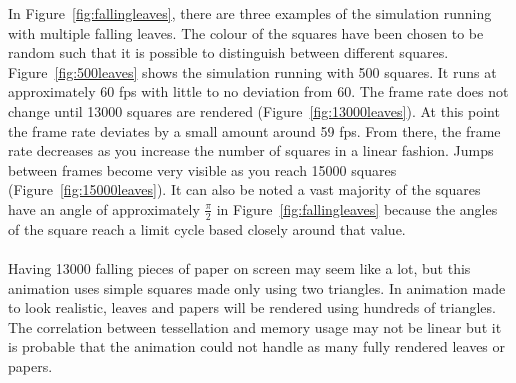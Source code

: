 \noindent In Figure~\ref{fig:fallingleaves}, there are three examples of the simulation running with multiple falling leaves. The colour of the squares have been chosen to be random such that it is possible to distinguish between different squares. Figure~\ref{fig:500leaves} shows the simulation running with 500 squares. It runs at approximately 60 fps with little to no deviation from 60. The frame rate does not change until 13000 squares are rendered (Figure~\ref{fig:13000leaves}). At this point the frame rate deviates by a small amount around 59 fps. From there, the frame rate decreases as you increase the number of squares in a linear fashion. Jumps between frames become very visible as you reach 15000 squares (Figure~\ref{fig:15000leaves}). It can also be noted a vast majority of the squares have an angle of approximately $\frac{\pi}{2}$ in Figure~\ref{fig:fallingleaves} because the angles of the square reach a limit cycle based closely around that value.
\\
\\
Having 13000 falling pieces of paper on screen may seem like a lot, but this animation uses simple squares made only using two triangles. In animation made to look realistic, leaves and papers will be rendered using hundreds of triangles. The correlation between tessellation and memory usage may not be linear but it is probable that the animation could not handle as many fully rendered leaves or papers. 